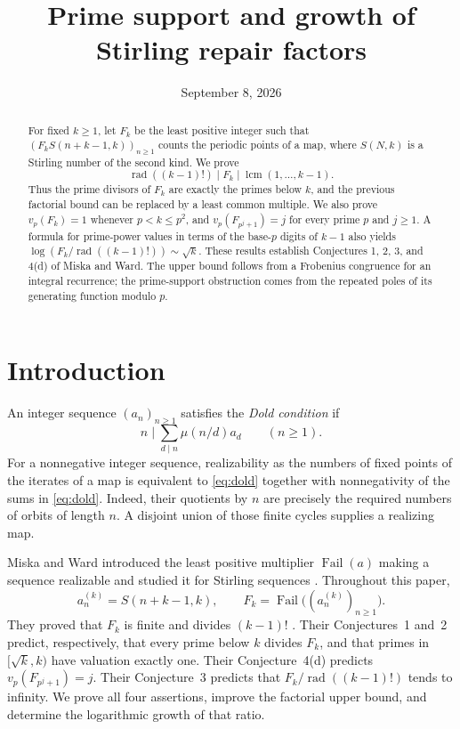 \documentclass[11pt]{article}
\title{Prime support and growth of Stirling repair factors}
\author{}
\date{September 8, 2026}
\theoremstyle{remark}
\DeclareMathOperator{\Fail}{Fail}
\DeclareMathOperator{\rad}{rad}
\DeclareMathOperator{\lcm}{lcm}
\begin{document}
\maketitle
\begin{abstract}
For fixed $k\geq1$, let $F_k$ be the least positive integer such that
$(F_k S(n+k-1,k))_{n\geq1}$ counts the periodic points of a map, where $S(N,k)$
is a Stirling number of the second kind. We prove
\[
 \rad((k-1)!)\mid F_k\mid\lcm(1,\ldots,k-1).
\]
Thus the prime divisors of $F_k$ are exactly the primes below $k$, and the
previous factorial bound can be replaced by a least common multiple.
We also prove $v_p(F_k)=1$ whenever $p<k\leq p^2$, and
$v_p(F_{p^j+1})=j$ for every prime $p$ and $j\geq1$.
A formula for prime-power values in terms of the base-$p$ digits of $k-1$
also yields
$\log(F_k/\rad((k-1)!))\sim\sqrt{k}$.
These results establish Conjectures 1, 2, 3, and 4(d) of Miska and Ward.
The upper bound follows from a Frobenius congruence for an integral recurrence;
the prime-support obstruction comes from the repeated poles of its generating
function modulo $p$.
\end{abstract}

\section{Introduction}
An integer sequence $(a_n)_{n\geq1}$ satisfies the \emph{Dold condition} if
\begin{equation}\label{eq:dold}
 n\mid\sum_{d\mid n}\mu(n/d)a_d\qquad(n\geq1).
\end{equation}
For a nonnegative integer sequence, realizability as the numbers of fixed
points of the iterates of a map is equivalent to \eqref{eq:dold} together with
nonnegativity of the sums in \eqref{eq:dold}. Indeed, their quotients by $n$
are precisely the required numbers of orbits of length $n$. A disjoint union
of those finite cycles supplies a realizing map.

Miska and Ward introduced the least positive multiplier $\Fail(a)$ making a
sequence realizable and studied it for Stirling sequences
\cite{MW}. Throughout this paper,
\[
 a_n^{(k)}=S(n+k-1,k),\qquad
 F_k=\Fail\bigl((a_n^{(k)})_{n\geq1}\bigr).
\]
They proved that $F_k$ is finite and divides $(k-1)!$
\cite[Theorem~2.2]{MW}. Their Conjectures~1 and~2 predict, respectively, that
every prime below $k$ divides $F_k$, and that primes in
$[\sqrt{k},k)$ have valuation exactly one. Their Conjecture~4(d) predicts
$v_p(F_{p^j+1})=j$. Their Conjecture~3 predicts that
$F_k/\rad((k-1)!)$ tends to infinity. We prove all four assertions, improve
the factorial upper bound, and determine the logarithmic growth of that ratio.
\end{document}
